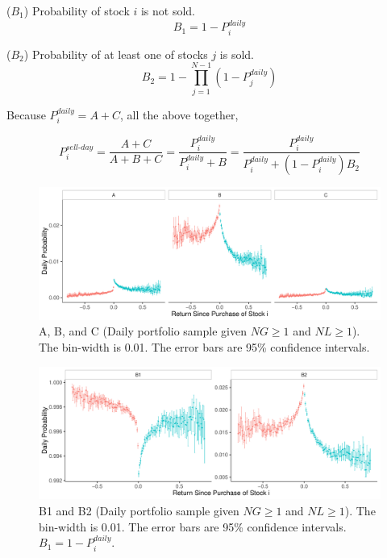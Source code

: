 \documentclass[11pt, a4paper]{article}
\newcommand{\HS}[1]{\textcolor{blue}{HS: #1}}
\begin{document}
\begin{appendices}
\noindent
($B_{1}$) Probability of stock $i$ is not sold.
\begin{equation}
\label{eq:B1}
B_1 = 1-P^{daily}_{i}
\end{equation}

\noindent
($B_{2}$) Probability of at least one of stocks $j$ is sold.
\begin{equation}
\label{eq:B2}
B_2 = 1-\prod_{j=1}^{N-1}(1-P^{daily}_{j})
\end{equation}

\noindent

Because $P^{daily}_{i} = A+C$, all the above together,

\begin{equation}
\label{eq:PABC}
P^{sell\mbox{-}day}_{i} = \frac{A+C}{A+B+C} = \frac{P^{daily}_{i}}{P^{daily}_{i}+B} = \frac{P^{daily}_{i}}{P^{daily}_{i}+(1-P^{daily}_{i})B_2}
\end{equation}



\begin{figure}[H]
	\centering
	\includegraphics[width=1\columnwidth]{barc_ABC_NG1_NL1_3.pdf}
	\caption{\small A, B, and C (Daily portfolio sample given $NG\geq1$ and $NL\geq1$). The bin-width is 0.01. The error bars are 95\% confidence intervals.}
	\label{figure:prop_ABC_NG1NL1}
\end{figure}

\begin{figure}[H]
	\centering
	\includegraphics[width=1\columnwidth]{barc_B12_NG1_NL1_3.pdf}
	\caption{\small B1 and B2 (Daily portfolio sample given $NG\geq1$ and $NL\geq1$). The bin-width is 0.01. The error bars are 95\% confidence intervals. $B_{1}=1-P^{daily}_{i}$.}
	\label{figure:prop_B12_NG1NL1}
\end{figure}


\end{appendices}
\end{document}
